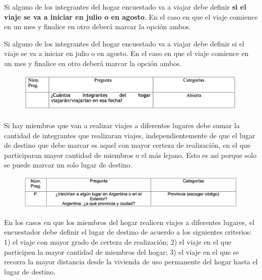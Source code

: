 \documentclass[
  openany]{book}
\begin{document}
Si alguno de los integrantes del hogar encuestado va a viajar debe definir \textbf{si el viaje se va a iniciar en julio o en agosto}. En el caso en que el viaje comience en un mes y finalice en otro deberá marcar la opción ambos.

Si alguno de los integrantes del hogar encuestado va a viajar debe definir si el viaje se va a iniciar en julio o en agosto. En el caso en que el viaje comience en un mes y finalice en otro deberá marcar la opción ambos.

\begin{figure}

{\centering \includegraphics[width=1\linewidth]{imagenes/figura6-307} 

}

\end{figure}

Si hay miembros que van a realizar viajes a diferentes lugares debe sumar la cantidad de integrantes que realizaran viajes, independientemente de que el lugar de destino que debe marcar es aquel con mayor certeza de realización, en el que participaran mayor cantidad de miembros o el más lejano. Esto es así porque solo se puede marcar un solo lugar de destino.

\begin{figure}

{\centering \includegraphics[width=1\linewidth]{imagenes/figura6-308} 

}

\end{figure}

En los casos en que los miembros del hogar realicen viajes a diferentes lugares, el encuestador debe definir el lugar de destino de acuerdo a los siguientes criterios: 1) el viaje con mayor grado de certeza de realización; 2) el viaje en el que participen la mayor cantidad de miembros del hogar; 3) el viaje en el que se recorra la mayor distancia desde la vivienda de uso permanente del hogar hasta el lugar de destino.
\end{document}
